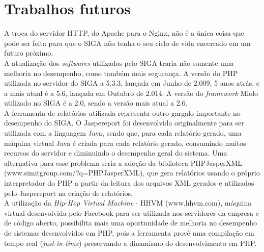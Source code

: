 \section{Trabalhos futuros}
A troca do servidor HTTP, do Apache para o Nginx, não é a única coisa que pode 
ser feita para que o SIGA não tenha o seu ciclo de vida encerrado em um futuro 
próximo.\\
A atualização dos \textit{softwares} utilizados pelo SIGA traria não somente 
uma melhoria no desempenho, como também mais segurança. A versão do PHP 
utilizada no servidor do SIGA a 5.3.3, lançada em Junho de 2.009, 5 anos atrás, 
e a mais atual é a 5.6, lançada em Outubro de 2.014. A versão do 
\textit{framework} Miolo utilizado no SIGA é a 2.0, sendo a versão mais atual a 
2.6.\\
A ferramenta de relatórios utilizada representa outro gargalo importante no 
desempenho do SIGA. O Jaspereport foi desenvolvida originalmente para ser 
utilizada com a linguagem Java, sendo que, para cada relatório gerado, uma 
máquina virtual Java é criada para cada relatório gerado, consumindo muitos 
recursos do servidor e diminuindo o desempenho geral do sistema. Uma 
alternativa para esse problema seria a adoção da biblioteca PHPJasperXML 
(www.simitgroup.com/?q=PHPJasperXML), que gera relatórios usando o próprio 
interpretador do PHP a partir da leitura dos arquivos XML gerados e utilizados 
pelo Jaspereport na criação de relatórios.\\
A utilização da \textit{Hip-Hop Virtual Machine} - HHVM (www.hhvm.com), máquina 
virtual desenvolvida pelo Facebook para ser utilizada nos servidores da empresa 
e de código aberto, possibilita mais uma oportunidade de melhoria no desempenho 
de sistemas desenvolvidos em PHP, pois a ferramenta provê uma compilação em 
tempo real (\textit{just-in-time}) preservando a dinamismo do desenvolvimento 
em PHP.